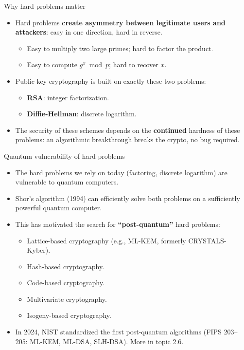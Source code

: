 \ifdefined\PRESENTATION\else\PassOptionsToClass{handout}{beamer}\fi\documentclass[aspectratio=169, lualatex]{beamer}
\begin{document}
\begin{frame}{Why hard problems matter}
	\begin{itemize}[<+->]
		\item Hard problems \textbf{create asymmetry between legitimate users and attackers}: easy in one direction, hard in reverse.
		      \begin{itemize}
			      \item Easy to multiply two large primes; hard to factor the product.
			      \item Easy to compute $g^x \bmod p$; hard to recover $x$.
		      \end{itemize}
		\item Public-key cryptography is built on exactly these two problems:
		      \begin{itemize}
			      \item \textbf{RSA}: integer factorization.
			      \item \textbf{Diffie-Hellman}: discrete logarithm.
		      \end{itemize}
		\item The security of these schemes depends on the \textbf{continued} hardness of these problems: an algorithmic breakthrough breaks the crypto, no bug required.
	\end{itemize}
\end{frame}

\begin{frame}{Quantum vulnerability of hard problems}
	\begin{itemize}[<+->]
		\item The hard problems we rely on today (factoring, discrete logarithm) are vulnerable to quantum computers.
		\item Shor's algorithm (1994) can efficiently solve both problems on a sufficiently powerful quantum computer.
		\item This has motivated the search for \textbf{``post-quantum''} hard problems:
		      \begin{itemize}[<+->]
			      \item Lattice-based cryptography (e.g., ML-KEM, formerly CRYSTALS-Kyber).
			      \item Hash-based cryptography.
			      \item Code-based cryptography.
			      \item Multivariate cryptography.
			      \item Isogeny-based cryptography.
		      \end{itemize}
		\item In 2024, NIST standardized the first post-quantum algorithms (FIPS 203--205: ML-KEM, ML-DSA, SLH-DSA). More in topic 2.6.
	\end{itemize}
\end{frame}
\end{document}
